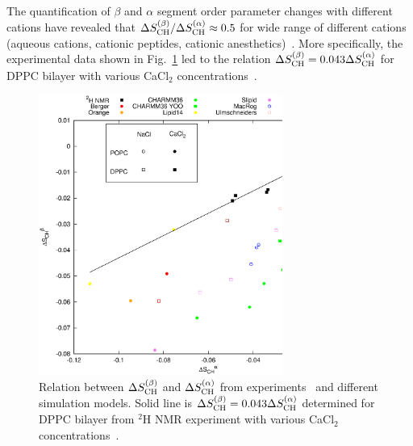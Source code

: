 \documentclass[pre,aps,floatfix,authordate1-4,twocolumn]{revtex4-1}
\begin{document}
The quantification of $\beta$ and $\alpha$ segment order parameter changes 
with different cations
have revealed that $\Delta S_{\rm{CH}}^{(\beta)}/\Delta S_{\rm{CH}}^{(\alpha)} \approx0.5$ for wide range
of different cations (aqueous cations, cationic peptides, cationic anesthetics)~\cite{beschiasvili91,rydall92}.
More specifically, the experimental data shown in Fig.~\ref{AvsB} led to the 
relation $\Delta S_{\rm{CH}}^{(\beta)}=0.043\Delta S_{\rm{CH}}^{(\alpha)}$ for DPPC bilayer
with various CaCl$_2$ concentrations~\cite{akutsu81}.
\begin{figure}[]
  \centering
  \includegraphics[width=8cm]{../Fig/OrderParameterAvsB.eps}
  \caption{\label{AvsB}
    Relation between $\Delta S_{\rm{CH}}^{(\beta)}$ and $\Delta S_{\rm{CH}}^{(\alpha)}$ from experiments~\cite{akutsu81} and
    different simulation models. Solid line is $\Delta S_{\rm{CH}}^{(\beta)}=0.043\Delta S_{\rm{CH}}^{(\alpha)}$ determined for DPPC bilayer
    from $^2$H NMR experiment with various CaCl$_2$ concentrations~\cite{akutsu81}.
  }
\end{figure}
\end{document}
